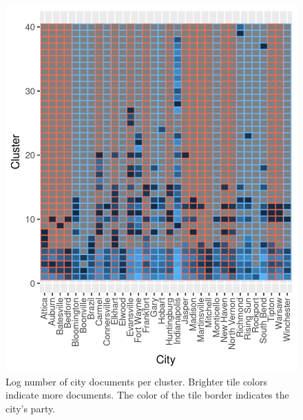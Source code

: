 \documentclass[11pt]{article}
\begin{document}
\begin{figure}[!ht]
	\centering
	\caption{Log number of city documents per cluster. Brighter tile colors indicate more documents. The color of the tile border indicates the city's party.}
	\label{hclustCity40}
	\includegraphics[width=\linewidth]{figures/heatmap_hclust_40.png}
\end{figure}
\end{document}
